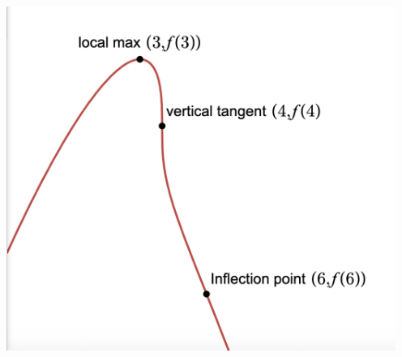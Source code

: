 \begin{enumerate}
\begin{center}
\centerline{\includegraphics[width = 5in]{./AppDerivativesGraphics/graphfromderivativeexerciseanswer.png}}
\end{center}


\setcounter{HW}{\value{enumi}}
\end{enumerate}


